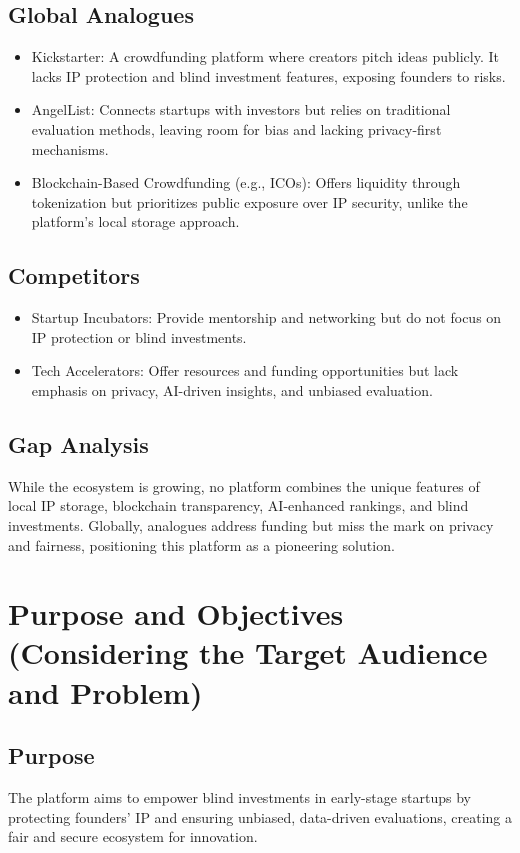 \documentclass[12pt]{article}
\begin{document}
\subsection{Global Analogues}
\begin{itemize}
    \item Kickstarter: A crowdfunding platform where creators pitch ideas publicly. It lacks IP protection and blind investment features, exposing founders to risks.
    \item AngelList: Connects startups with investors but relies on traditional evaluation methods, leaving room for bias and lacking privacy-first mechanisms.
    \item Blockchain-Based Crowdfunding (e.g., ICOs): Offers liquidity through tokenization but prioritizes public exposure over IP security, unlike the platform's local storage approach.
\end{itemize}

\subsection{Competitors}
\begin{itemize}
    \item Startup Incubators: Provide mentorship and networking but do not focus on IP protection or blind investments.
    \item Tech Accelerators: Offer resources and funding opportunities but lack emphasis on privacy, AI-driven insights, and unbiased evaluation.
\end{itemize}

\subsection{Gap Analysis}
While the ecosystem is growing, no platform combines the unique features of local IP storage, blockchain transparency, AI-enhanced rankings, and blind investments. Globally, analogues address funding but miss the mark on privacy and fairness, positioning this platform as a pioneering solution.

\section{Purpose and Objectives (Considering the Target Audience and Problem)}

\subsection{Purpose}
The platform aims to empower blind investments in early-stage startups by protecting founders' IP and ensuring unbiased, data-driven evaluations, creating a fair and secure ecosystem for innovation.
\end{document}
